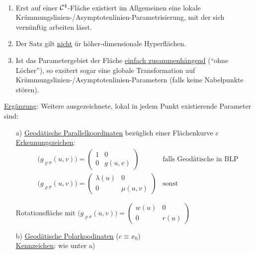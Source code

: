 \begin{bemerkung} \(\)
 \begin{enumerate}
  \item Erst auf einer \(\mathcal{C}^4\)-Fläche existiert im Allgemeinen eine lokale Krümmungslinien-/Asymptoten\-linien-Parametrisierung, mit der sich vernünftig arbeiten lässt.
  \item Der Satz gilt \uline{nicht} ür höher-dimensionale Hyperflächen.
  \item Ist das Parametergebiet der Fläche \uline{einfach zusammenhängend} ("`ohne Löcher"'), so exsitert sogar eine globale Transformation auf Krümmungslinien-/Asymptotenlinien-Parametern (falls keine Nabelpunkte stören).
 \end{enumerate}

\end{bemerkung}

\uline{Ergänzung}: Weitere ausgezeichnete, lokal in jedem Punkt existierende Parameter sind:
\begin{enumerate}
 \item[a)] \uline{Geodätische Parallelkoordinaten} bezüglich einer Flächenkurve \(c\) \\
 \;\uline{Erkennungszeichen}: 
 \begin{align*}
  &\big(g_{\varrho \sigma}(u,v)\big) = \begin{pmatrix}
                                      1 & 0 \\
                                      0 & g(u,v)
                                     \end{pmatrix}&\text{falls Geodätische in BLP} \\
  &\big(g_{\varrho \sigma}(u,v)\big) = \begin{pmatrix}
                                        \lambda(u) & 0 \\
                                        0 & \mu(u,v)
                                       \end{pmatrix}&\text{sonst}
 \end{align*}
 \begin{bsp}
  Rotationsfläche mit \(\big(g_{\varrho \sigma}(u,v)\big) = \begin{pmatrix}
                                                             w(u) & 0 \\
                                                             0 & r(u)
                                                            \end{pmatrix}\)
 \end{bsp}
 \item[b)] \uline{Geodätische Polarkoodinaten} (\(c \equiv x_0\)) \\
 \uline{Kennzeichen}: wie unter a)
\end{enumerate}

